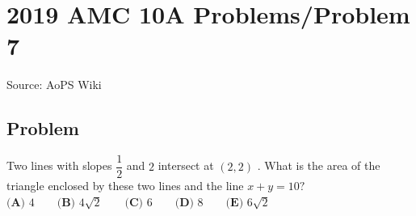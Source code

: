 \documentclass[12pt]{article}
\begin{document}
\section*{{2019 AMC 10A Problems/Problem 7}}
Source: AoPS Wiki

\subsection*{Problem}
Two lines with slopes $\dfrac{1}{2}$ and $2$ intersect at $(2,2)$ . What is the area of the triangle enclosed by these two lines and the line $x+y=10 ?$ $\textbf{(A) } 4 \qquad\textbf{(B) } 4\sqrt{2} \qquad\textbf{(C) } 6 \qquad\textbf{(D) } 8 \qquad\textbf{(E) } 6\sqrt{2}$
\end{document}
